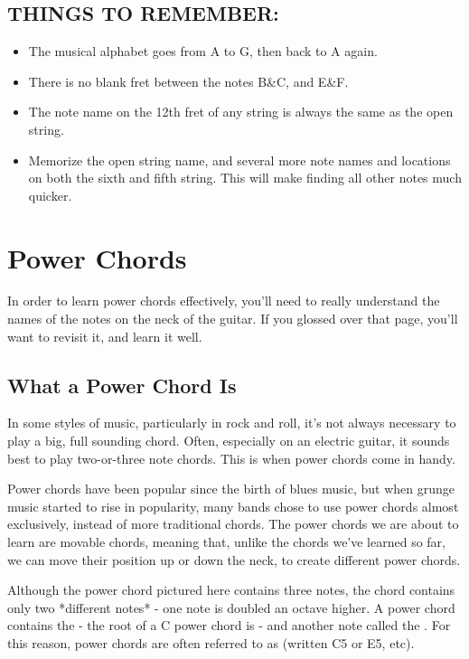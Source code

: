 \subsection{THINGS TO REMEMBER:}
\begin{itemize}
\item The musical alphabet goes from A to G, then back to A again.
\item There is no blank fret between the notes B\&C, and E\&F.
\item The note name on the 12th fret of any string is always the same as the
      open string.
\item Memorize the open string name, and several more note names and locations
      on both the sixth and fifth string. This will make finding all other notes much
      quicker.
\end{itemize}

\section{Power Chords}
In order to learn power chords effectively, you'll need to really understand
the names of the notes on the neck of the guitar. If you glossed over that
page, you'll want to revisit it, and learn it well.

\subsection{What a Power Chord Is}

In some styles of music, particularly in rock and roll, it's not always
necessary to play a big, full sounding chord. Often, especially on an electric
guitar, it sounds best to play two-or-three note chords. This is when power
chords come in handy.

Power chords have been popular since the birth of blues music, but when grunge
music started to rise in popularity, many bands chose to use power chords
almost exclusively, instead of more traditional chords. The power chords we
are about to learn are movable chords, meaning that, unlike the chords we've
learned so far, we can move their position up or down the neck, to create
different power chords.

Although the power chord pictured here contains three notes, the chord contains
only two *different notes* - one note is doubled an octave higher. A power
chord contains the  - the root of a C power chord is  - and
another note called the . For this reason, power chords are often
referred to as  (written C5 or E5, etc).

